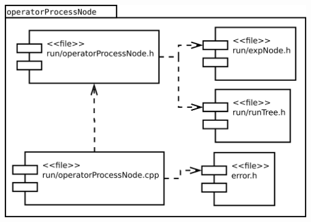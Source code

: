\begin{center}
\includegraphics[scale=0.3]{files_arquitecture/operatorProcessNode.png} \\
\end{center}

